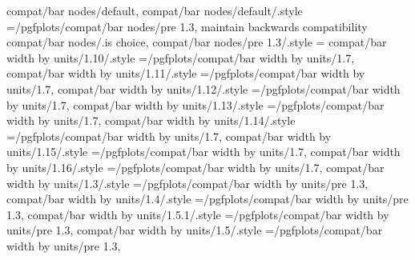 {{{{{{compat/bar nodes/default,
compat/bar nodes/default/.style                                    ={/pgfplots/compat/bar nodes/pre 1.3}, maintain backwards compatibility                                                            
compat/bar nodes/.is choice,
compat/bar nodes/pre 1.3/.style                                    ={                                                                                                                                 
compat/bar width by units/1.10/.style                              ={/pgfplots/compat/bar width by units/1.7},                                                                                         
compat/bar width by units/1.11/.style                              ={/pgfplots/compat/bar width by units/1.7},                                                                                         
compat/bar width by units/1.12/.style                              ={/pgfplots/compat/bar width by units/1.7},                                                                                         
compat/bar width by units/1.13/.style                              ={/pgfplots/compat/bar width by units/1.7},                                                                                         
compat/bar width by units/1.14/.style                              ={/pgfplots/compat/bar width by units/1.7},                                                                                         
compat/bar width by units/1.15/.style                              ={/pgfplots/compat/bar width by units/1.7},                                                                                         
compat/bar width by units/1.16/.style                              ={/pgfplots/compat/bar width by units/1.7},                                                                                         
compat/bar width by units/1.3/.style                               ={/pgfplots/compat/bar width by units/pre 1.3},                                                                                     
compat/bar width by units/1.4/.style                               ={/pgfplots/compat/bar width by units/pre 1.3},                                                                                    
compat/bar width by units/1.5.1/.style                             ={/pgfplots/compat/bar width by units/pre 1.3},                                                                                    
compat/bar width by units/1.5/.style                               ={/pgfplots/compat/bar width by units/pre 1.3},                                                                                    
}}}}}}}
